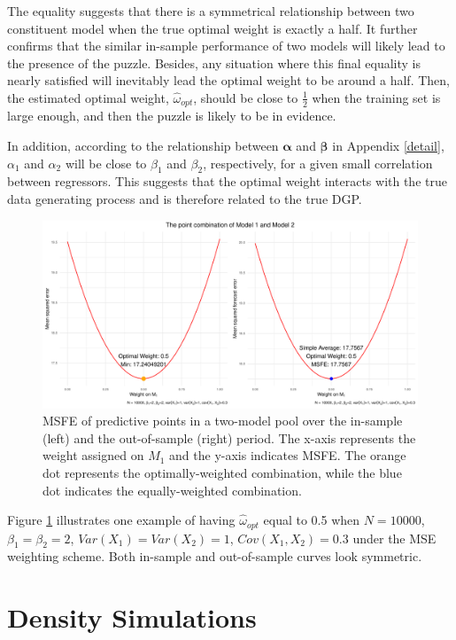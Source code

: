 \documentclass{monashthesis}
\begin{document}
The equality suggests that there is a symmetrical relationship between two constituent model when the true optimal weight is exactly a half. It further confirms that the similar in-sample performance of two models will likely lead to the presence of the puzzle. Besides, any situation where this final equality is nearly satisfied will inevitably lead the optimal weight to be around a half. Then, the estimated optimal weight, \(\hat\omega_{opt}\), should be close to \(\frac{1}{2}\) when the training set is large enough, and then the puzzle is likely to be in evidence.

In addition, according to the relationship between \(\pmb \alpha\) and \(\pmb \beta\) in Appendix \ref{detail}, \(\alpha_1\) and \(\alpha_2\) will be close to \(\beta_1\) and \(\beta_2\), respectively, for a given small correlation between regressors. This suggests that the optimal weight interacts with the true data generating process and is therefore related to the true DGP.

\begin{figure}[ht]
\centering
\includegraphics[scale=0.6]{figures/MSFE.pdf}
\caption{MSFE of predictive points in a two-model pool over the in-sample (left) and the out-of-sample (right) period. The x-axis represents the weight assigned on $M_1$ and the y-axis indicates MSFE. The orange dot represents the optimally-weighted combination, while the blue dot indicates the equally-weighted combination.}
\label{fig:msfe}
\end{figure}

Figure \ref{fig:msfe} illustrates one example of having \(\hat\omega_{opt}\) equal to 0.5 when \(N = 10000\), \(\beta_1=\beta_2=2\), \(Var(X_1)=Var(X_2)=1\), \(Cov(X_1,X_2)=0.3\) under the MSE weighting scheme. Both in-sample and out-of-sample curves look symmetric.

\hypertarget{density-simulations}{%
\section{Density Simulations}\label{density-simulations}}
\end{document}
